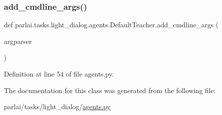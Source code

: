 \subsubsection{\texorpdfstring{add\+\_\+cmdline\+\_\+args()}{add\_cmdline\_args()}}
{\footnotesize\ttfamily def parlai.\+tasks.\+light\+\_\+dialog.\+agents.\+Default\+Teacher.\+add\+\_\+cmdline\+\_\+args (\begin{DoxyParamCaption}\item[{}]{argparser }\end{DoxyParamCaption})\hspace{0.3cm}{\ttfamily [static]}}



Definition at line 54 of file agents.\+py.



The documentation for this class was generated from the following file\+:\begin{DoxyCompactItemize}
\item 
parlai/tasks/light\+\_\+dialog/\hyperlink{parlai_2tasks_2light__dialog_2agents_8py}{agents.\+py}\end{DoxyCompactItemize}
